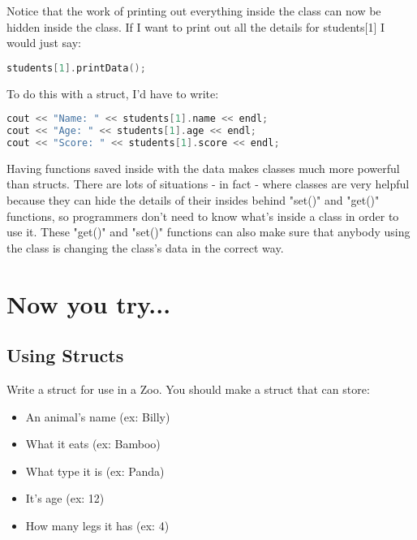 \documentclass[a4paper,12pt]{article} %
\begin{document}
\vspace{5mm}


\noindent
Notice that the work of printing out everything inside the class can now be hidden inside the class. If I want to print out all the details for students[1] I would just say:

\vspace{5mm}
\begin{lstlisting}[language=C++]
students[1].printData();
\end{lstlisting}

\noindent
To do this with a struct, I'd have to write:

\vspace{5mm}
\begin{lstlisting}[language=C++]
cout << "Name: " << students[1].name << endl;
cout << "Age: " << students[1].age << endl;
cout << "Score: " << students[1].score << endl;
\end{lstlisting}

\noindent
Having functions saved inside with the data makes classes much more powerful than structs. There are lots of situations - in fact - where classes are very helpful because they can hide the details of their insides behind "set()" and "get()" functions, so programmers don't need to know what's inside a class in order to use it. These "get()" and "set()" functions can also make sure that anybody using the class is changing the class's data in the correct way. 

\clearpage

\section{Now you try...}

\subsection{Using Structs}

Write a struct for use in a Zoo. You should make a struct that can store:

\begin{itemize}
\item An animal's name (ex: Billy)
\item What it eats (ex: Bamboo)
\item What type it is (ex: Panda)
\item It's age (ex: 12)
\item How many legs it has (ex: 4)
\end{itemize}
\end{document}
